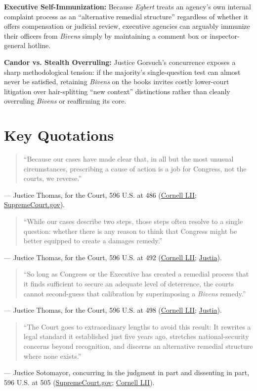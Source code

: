\documentclass[12pt]{article}
\begin{document}
\textbf{Executive Self-Immunization:} Because \textit{Egbert} treats an agency's own internal complaint process as an ``alternative remedial structure'' regardless of whether it offers compensation or judicial review, executive agencies can arguably immunize their officers from \textit{Bivens} simply by maintaining a comment box or inspector-general hotline.

\textbf{Candor vs. Stealth Overruling:} Justice Gorsuch's concurrence exposes a sharp methodological tension: if the majority's single-question test can almost never be satisfied, retaining \textit{Bivens} on the books invites costly lower-court litigation over hair-splitting ``new context'' distinctions rather than cleanly overruling \textit{Bivens} or reaffirming its core.

\section{Key Quotations}
\begin{quote}
``Because our cases have made clear that, in all but the most unusual circumstances, prescribing a cause of action is a job for Congress, not the courts, we reverse.''
\end{quote}
\noindent --- Justice Thomas, for the Court, 596 U.S. at 486 (\href{https://www.law.cornell.edu/supremecourt/text/21-147}{Cornell LII}; \href{https://www.supremecourt.gov/opinions/21pdf/596us1r37_7l48.pdf}{SupremeCourt.gov}).

\begin{quote}
``While our cases describe two steps, those steps often resolve to a single question: whether there is any reason to think that Congress might be better equipped to create a damages remedy.''
\end{quote}
\noindent --- Justice Thomas, for the Court, 596 U.S. at 492 (\href{https://www.law.cornell.edu/supremecourt/text/21-147}{Cornell LII}; \href{https://supreme.justia.com/cases/federal/us/596/21-147/}{Justia}).

\begin{quote}
``So long as Congress or the Executive has created a remedial process that it finds sufficient to secure an adequate level of deterrence, the courts cannot second-guess that calibration by superimposing a \textit{Bivens} remedy.''
\end{quote}
\noindent --- Justice Thomas, for the Court, 596 U.S. at 498 (\href{https://www.law.cornell.edu/supremecourt/text/21-147}{Cornell LII}; \href{https://supreme.justia.com/cases/federal/us/596/21-147/}{Justia}).

\begin{quote}
``The Court goes to extraordinary lengths to avoid this result: It rewrites a legal standard it established just five years ago, stretches national-security concerns beyond recognition, and discerns an alternative remedial structure where none exists.''
\end{quote}
\noindent --- Justice Sotomayor, concurring in the judgment in part and dissenting in part, 596 U.S. at 505 (\href{https://www.supremecourt.gov/opinions/21pdf/596us1r37_7l48.pdf}{SupremeCourt.gov}; \href{https://www.law.cornell.edu/supremecourt/text/21-147}{Cornell LII}).
\end{document}
